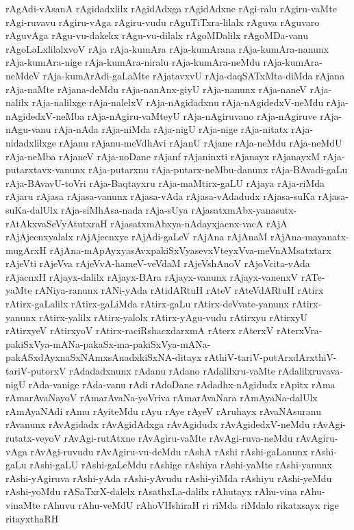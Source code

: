 {rAgAdi-vAsanA
rAgidadxlilx
rAgidAdxga
rAgidAdxne
rAgi-ralu
rAgiru-vaMte
rAgi-ruvavu
rAgiru-vAga
rAgiru-vudu
rAguTiTxra-lilalx
rAguva
rAguvaro
rAguvAga
rAgu-vu-dakekx
rAgu-vu-dilalx
rAgoMDalilx
rAgoMDa-vanu
rAgoLaLxlilalxvoV
rAja
rAja-kumAra
rAja-kumArana
rAja-kumAra-nanunx
rAja-kumAra-nige
rAja-kumAra-niralu
rAja-kumAra-neMdu
rAja-kumAra-neMdeV
rAja-kumArAdi-gaLaMte
rAjatavxvU
rAja-daqSATxMta-diMda
rAjana
rAja-naMte
rAjana-deMdu
rAja-nanAnx-giyU
rAja-nanunx
rAja-naneV
rAja-nalilx
rAja-nalilxge
rAja-nalelxV
rAja-nAgidadxnu
rAja-nAgidedxV-neMdu
rAja-nAgidedxV-neMba
rAja-nAgiru-vaMteyU
rAja-nAgiruvano
rAja-nAgiruve
rAja-nAgu-vanu
rAja-nAda
rAja-niMda
rAja-nigU
rAja-nige
rAja-nitatx
rAja-nidadxlilxge
rAjanu
rAjanu-meVdhAvi
rAjanU
rAjane
rAja-neMdu
rAja-neMdU
rAja-neMba
rAjaneV
rAja-noDane
rAjanf
rAjaninxti
rAjanayx
rAjanayxM
rAja-putarxtavx-vanunx
rAja-putarxnu
rAja-putarx-neMbu-danunx
rAja-BAvadi-gaLu
rAja-BAvavU-toVri
rAja-Baqtayxru
rAja-maMtirx-gaLU
rAjaya
rAja-riMda
rAjaru
rAjasa
rAjasa-vanunx
rAjasa-vAda
rAjasa-vAdadudx
rAjasa-suKa
rAjasa-suKa-dalUlx
rAja-siMhAsa-nada
rAja-sUya
rAjasatxmAbx-yanasutx-rAtAkxvaSeVyAtutxraH
rAjasatxmAbxya-nAdayxjacnx-vacA
rAjA
rAjAjecnxyalalx
rAjAjecnxye
rAjAdi-gaLeV
rAjAna
rAjAnaM
rAjAna-mayanatx-mugArxH
rAjAna-mApAyxyasAvxpakiSxVyasevxVteyxVva-meVnAMsatxtarx
rAjeVti
rAjeVva
rAjeVvA-hameV-veVdaM
rAjeVshAnoV
rAjoVcita-vAda
rAjacnxH
rAjayx-dalilx
rAjayx-BAra
rAjayx-vanunx
rAjayx-vanenxV
rATe-yaMte
rANiya-ranunx
rANi-yAda
rAtidARtuH
rAteV
rAteVdARtuH
rAtirx
rAtirx-gaLalilx
rAtirx-gaLiMda
rAtirx-gaLu
rAtirx-deVvate-yanunx
rAtirx-yanunx
rAtirx-yalilx
rAtirx-yalolx
rAtirx-yAgu-vudu
rAtirxyu
rAtirxyU
rAtirxyeV
rAtirxyoV
rAtirx-raciRshacxdarxmA
rAterx
rAterxV
rAterxVra-pakiSxVya-mANa-pakaSx-ma-pakiSxVya-mANa-pakASxdAyxnaSxNAmxsAnadxkiSxNA-ditayx
rAthiV-tariV-putArxdArxthiV-tariV-putorxV
rAdadadxnunx
rAdanu
rAdano
rAdalilxru-vaMte
rAdalilxruvava-nigU
rAda-vanige
rAda-vanu
rAdi
rAdoDane
rAdadhx-nAgidudx
rApitx
rAma
rAmarAvaNayoV
rAmarAvaNa-yoVriva
rAmarAvaNara
rAmAyaNa-dalUlx
rAmAyaNAdi
rAmu
rAyiteMdu
rAyu
rAye
rAyeV
rAruhayx
rAvaNAsuranu
rAvanunx
rAvAgidadx
rAvAgidAdxga
rAvAgidudx
rAvAgidedxV-neMdu
rAvAgi-rutatx-veyoV
rAvAgi-rutAtxne
rAvAgiru-vaMte
rAvAgi-ruva-neMdu
rAvAgiru-vAga
rAvAgi-ruvudu
rAvAgiru-vu-deMdu
rAshA
rAshi
rAshi-gaLanunx
rAshi-gaLu
rAshi-gaLU
rAshi-gaLeMdu
rAshige
rAshiya
rAshi-yaMte
rAshi-yanunx
rAshi-yAgiruva
rAshi-yAda
rAshi-yAvudu
rAshi-yiMda
rAshiyu
rAshi-yeMdu
rAshi-yoMdu
rASaTxrX-dalelx
rAsathxLa-dalilx
rAhutayx
rAhu-vina
rAhu-vinaMte
rAhuvu
rAhu-veMdU
rAhoVHshiraH
ri
riMda
riMdalo
rikatxsayx
rige
ritayxthaRH
}
